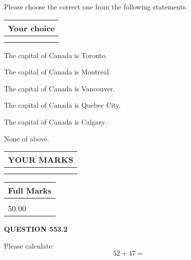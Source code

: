 \documentclass[12pt]{article}
\begin{document}
  
Please choose the correct one from the following statements.
  
  
\noindent\hspace{3.0in} \begin{tabular}{|l|}
\hline
Your choice \\
\hline
 \\ 
 \\ 
\hline
\end{tabular}
  
  
 
 
The capital of Canada is Toronto.
 
 
The capital of Canada is Montreal.
 
 
The capital of Canada is Vancouver.
 
 
The capital of Canada is Quebec City.
 
 
The capital of Canada is Calgary.
 
 
 None of above.
 
 
  
\vspace{0.2in}
  
\noindent\begin{tabular}{|l|}
\hline
 YOUR MARKS  \\
\hline
 \\ 
 \\ 
\hline
\end{tabular}
\hspace{0.05in} \begin{tabular}{|l|}
\hline
 Full Marks  \\
\hline
 \\ 
50.00 \\
\hline
\end{tabular}
{\textbf{\Large{QUESTION
553.2 
}}}
  
  
 
Please calculate:
\begin{equation}
52 +  %
47 = \nonumber
\end{equation}
 

 

 
   
   
 \vspace{0.2in}
 
   
   
   
   
\end{document}

